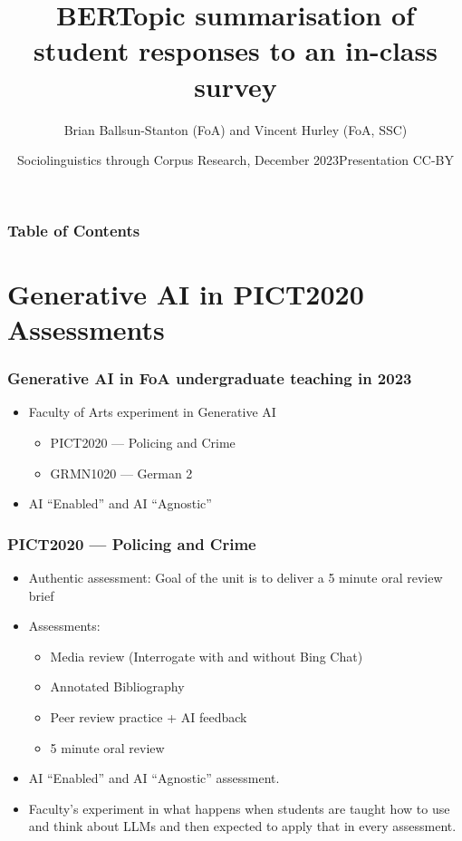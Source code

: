 \documentclass[xcolor={dvipsnames},aspectratio=169]{beamer}
\title[Berttopic] %
{BERTopic summarisation of
student responses to an in-class survey}
\author[Brian Ballsun-Stanton] %
{Brian Ballsun-Stanton (FoA) and Vincent Hurley (FoA, SSC)}
\date[13 December 2023] %
{Sociolinguistics through Corpus Research, December 2023\newline{}Presentation CC-BY}
\begin{document}
\frame{\titlepage}


\begin{frame}
\frametitle{Table of Contents}
\tableofcontents
\end{frame}


\section{Generative AI in PICT2020 Assessments}

\begin{frame}
\frametitle{Generative AI in FoA undergraduate teaching in 2023}

\begin{itemize}
    \item Faculty of Arts experiment in Generative AI 
    \begin{itemize}
        \item PICT2020 --- Policing and Crime
        \item GRMN1020 --- German 2
    \end{itemize}
    \item AI ``Enabled'' and AI ``Agnostic''
\end{itemize}

\end{frame}

\begin{frame}
\frametitle{PICT2020 --- Policing and Crime}

\begin{itemize}
    \item Authentic assessment: Goal of the unit is to deliver a 5 minute oral review brief
    \item Assessments:
    \begin{itemize}
        \item Media review (Interrogate with and without Bing Chat)
        \item Annotated Bibliography
        \item Peer review practice + AI feedback
        \item 5 minute oral review
        
    \end{itemize}
    \item AI ``Enabled'' and AI ``Agnostic'' assessment.
    \item Faculty's experiment in what happens when students are taught how to use and think about LLMs and then expected to apply that in every assessment.
\end{itemize}

\end{frame}
\end{document}
